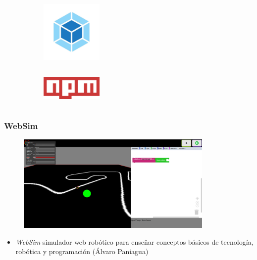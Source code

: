 \documentclass[xcolor={table}]{beamer}
\begin{document}
\begin{frame}
\begin{figure}[H]
\begin{subfigure}{\textwidth}
                \label{fig:figure2_7}
                \end{subfigure}\hfill
                \begin{subfigure}{\textwidth}                      \includegraphics[width=3cm, height=3cm]{img/webpack.jpeg}
                    \label{fig:figure2_9}
                    \end{subfigure}\hfill
                    \begin{subfigure}{\textwidth}
                        \includegraphics[width=3cm, height=2cm]{img/npm.png}
                    \label{fig:figure2_8}
                    \end{subfigure}\hfill
                    \label{fig:herramientas}
                    \end{figure}
        \end{frame}
        
        
	\begin{frame}
	\frametitle{WebSim}
	    \begin{figure}
	        \centering
	        \includegraphics[width=0.85\textwidth]{img/interfaz-websim.png}
	        \label{fig:websim}
	    \end{figure}
	    \begin{itemize}
            \begin{itemize}
    	    \item \textit{WebSim \textrightarrow}   simulador web robótico  para enseñar conceptos básicos de tecnología, robótica y programación (Álvaro Paniagua)
	     \end{itemize}{}
	\end{itemize}
\end{frame}
		
\end{document}
